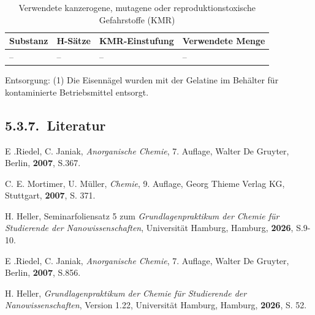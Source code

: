 \documentclass[12pt,a4paper]{article}
\newcommand{\versuchsabschnitt}[2]{\subsection*{5.3.#1.\ #2}}
\begin{document}
\begin{table}[H]
  \centering
  \caption{Verwendete kanzerogene, mutagene oder reproduktionstoxische Gefahrstoffe (KMR)}
  \label{tab:kmr}
  \begingroup
  \small
  \renewcommand{\arraystretch}{1.3}
  \begin{tabularx}{\linewidth}{@{}Y >{\centering\arraybackslash}p{2.4cm} >{\centering\arraybackslash}p{3cm} >{\centering\arraybackslash}p{2.4cm}@{}}
    \toprule
    Substanz & H-Sätze & KMR-Einstufung & Verwendete Menge \\
    \midrule
    -- & -- & -- & -- \\
    \bottomrule
  \end{tabularx}
  \endgroup
\end{table}

Entsorgung: (1) Die Eisennägel wurden mit der Gelatine im Behälter für kontaminierte Betriebsmittel entsorgt.

\clearpage


\versuchsabschnitt{7}{Literatur}
\begin{enumerate}[label={[\arabic*]}, leftmargin=0.8cm, labelsep=0.4cm]
	\item E .Riedel, C. Janiak, \textit{Anorganische Chemie}, 7. Auflage, Walter De Gruyter, Berlin, \textbf{2007}, S.367.
	\item C. E. Mortimer, U. Müller, \textit{Chemie}, 9. Auflage, Georg Thieme Verlag KG, Stuttgart, \textbf{2007}, S. 371.
	\item H. Heller, Seminarfoliensatz 5 zum \textit{\glqq{}Grundlagenpraktikum der Chemie für Studierende der Nanowissenschaften\grqq{}}, Universität Hamburg, Hamburg, \textbf{2026}, S.9-10.
	\item E .Riedel, C. Janiak, \textit{Anorganische Chemie}, 7. Auflage, Walter De Gruyter, Berlin, \textbf{2007}, S.856.
	\item H. Heller, \textit{Grundlagenpraktikum der Chemie für Studierende der Nanowissenschaften}, Version 1.22, Universität Hamburg, Hamburg, \textbf{2026}, S. 52.
\end{enumerate}
\end{document}
